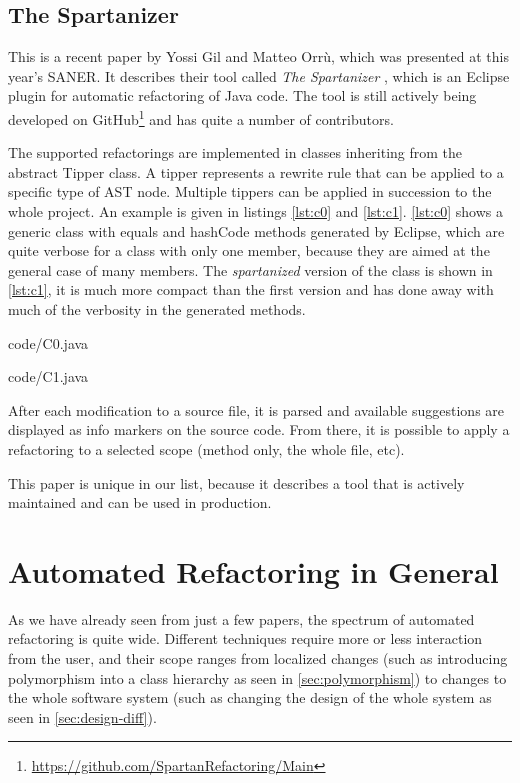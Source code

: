 \documentclass[conference,compsoc,a4paper]{IEEEtran}
\newcommand{\code}[1]{{\small\ttfamily #1}}
\begin{document}
\subsection{The Spartanizer} \label{sec:sparta}

This is a recent paper by Yossi Gil and Matteo Orrù, which was presented at this year's SANER. It describes their tool 
called \emph{The Spartanizer} \cite{sparta}, which is an Eclipse plugin for automatic refactoring of Java code. The 
tool is still actively being developed on GitHub\footnote{\url{https://github.com/SpartanRefactoring/Main}} and has 
quite a number of contributors.

The supported refactorings are implemented in classes inheriting from the abstract \code{Tipper} class. A tipper 
represents a rewrite rule that can be applied to a specific type of AST node. Multiple tippers can be applied in 
succession to the whole project. An example is given in listings \ref{lst:c0} and \ref{lst:c1}. \autoref{lst:c0} shows 
a generic class with \code{equals} and \code{hashCode} methods generated by Eclipse, which are quite verbose for a 
class with only one member, because they are aimed at the general case of many members. The \emph{spartanized} version 
of the class is shown in \autoref{lst:c1}, it is much more compact than the first version and has done away with much 
of the verbosity in the generated methods.


  {code/C0.java}


  {code/C1.java}

After each modification to a source file, it is parsed and available suggestions are displayed as info markers on the 
source code. From there, it is possible to apply a refactoring to a selected scope (method only, the whole file, etc).

This paper is unique in our list, because it describes a tool that is actively maintained and can be used in 
production.


\section{Automated Refactoring in General}

As we have already seen from just a few papers, the spectrum of automated refactoring is quite wide. Different 
techniques require more or less interaction from the user, and their scope ranges from localized changes (such as 
introducing polymorphism into a class hierarchy as seen in \autoref{sec:polymorphism}) to changes to the whole software 
system (such as changing the design of the whole system as seen in \autoref{sec:design-diff}).
\end{document}
